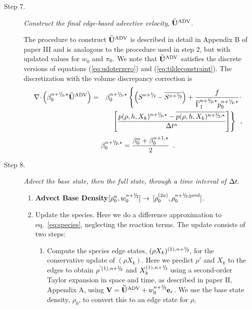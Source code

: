 \begin{description}
\begin{enumerate}
\end{enumerate}

\item[Step 7.] {\em Construct the final edge-based advective velocity}, $\widetilde{\mathbf{U}}^{\mathrm{ADV}}$.

The procedure to construct $\widetilde{\mathbf{U}}^{\mathrm{ADV}}$ is described in detail in Appendix B of paper III
and is analogous to the procedure used in step 2, but with updated values
for $w_0$ and $\pi_0.$  We note that $\widetilde{\mathbf{U}}^{\mathrm{ADV}}$ satisfies the discrete versions of 
equations (\ref{eq:udoterzero}) and (\ref{eq:tildeconstraint}).   The discretization
with the volume discrepancy correction is
\begin{eqnarray}
\nablab \cdotb \left(\beta_0^{\nph,\star} \uadvtwo\right) &=&
\beta_0^{\nph,\star}\left\{\left(S^{\nph} - \overline{S^{\nph}}\right)
 + \frac{f}{\gammabar^{\nph,\star} p_0^{\nph,\star}}\cdot \right. \nonumber \\
&& \left.\left[\frac{p(\rho,h,X_k)^{\nph,\star} - \overline{p(\rho,h,X_k)^{\nph,\star}}}{\Delta t^n}\right]\right\} \enskip ,
\end{eqnarray}
\begin{equation}
\beta_0^{\nph,\star} = \frac{ \beta_0^n +  \beta_0^{n+1,\star} }{2} \enskip .
\end{equation}

\item[Step 8.] {\em Advect the base state, then the full state, through a time interval of $\Delta t.$}

\begin{enumerate}
\renewcommand{\theenumi}{{\bf \alph{enumi}}}

\item {\bf Advect Base Density}$[\rho_0^{n},w_0^{\nph}] \rightarrow$ 
$[\rho_0^{(2a)}, \rho_0^{\nph,{\rm pred}}]$.

\item Update the species.  Here we do a difference approximation to
  eq.~\ref{eq:species}, neglecting the reaction terms.  The
  update consists of two steps:

  \begin{enumerate}
  \renewcommand{\labelenumii}{{\bf \roman{enumii}}.}

  \item Compute the species edge states, $(\rho X_k)^{(1),\nph}$, for
    the conservative update of $(\rho X_k)$.  Here we predict $\rho'$ 
    and $X_k$ to the edges to obtain $\rho^{'(1),\nph}$ and 
    $X_k^{(1),\nph}$ using a second-order Taylor expansion in
    space and time, as described in paper II, Appendix A, using $\Vb =
    \uadvtwo+w_0^{\nph} \er$.  We use the base
    state density, $\rho_0$, to convert this to an edge state for $\rho$,


\end{enumerate}
\end{enumerate}
\end{description}
